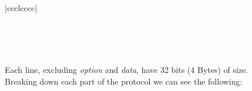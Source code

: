 \documentclass[11pt,a4paper]{report}
\begin{document}
\begin{center}
\begin{longtable}{|ccclcccc|}
                                                                                                                                                                                                                                                                                                                                                                                                                                                                                                           \\ \hline
                                                                                                                                                                                                                                                                                                                                                                                                                                                                                                                        \\ \hline
                                                                                                                                                                                                                                                                                                                                                                                                                                                                                                                \\ \hline
                \caption{IPv4 datagram dissected}
                \label{tab:ipdatagram}\\
            \end{longtable}
        \end{center}

        Each line, excluding \textit{option} and \textit{data}, have 32 bits (4 Bytes) of size.\\
        Breaking down each part of the protocol we can see the following:\\
\end{document}

